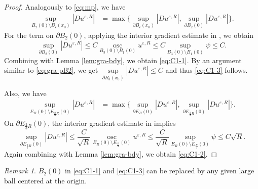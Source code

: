 \documentclass[reqno]{amsart}
\theoremstyle{remark}
\newtheorem{remark}[theorem]{Remark}
\theoremstyle{definition}
\numberwithin{equation}{section}
\begin{document}
\begin{proof}
	Analogously to \eqref{eq:mp}, we have
    \begin{equation*}
    \begin{aligned}
        \sup_{B_2(0) \setminus B_\varepsilon(x_0)} |Du^{\varepsilon,R}| 
        &= \max \Big\{ \sup_{\partial B_\varepsilon(x_0)} |Du^{\varepsilon,R}|, \sup_{\partial B_2(0)} |Du^{\varepsilon,R}| \Big\}.
    \end{aligned}
    \end{equation*}
	For the term on $\partial B_{2}(0)$, applying the interior gradient estimate in \cite{Chou-Wang}, we obtain
    \begin{equation}\label{eq:gra-pB2}
        \sup_{\partial B_2(0)} |Du^{\varepsilon,R}| \leq C\operatorname*{osc}_{B_3(0) \setminus B_1(0)} u^{\varepsilon,R} \leq C \sup_{B_3(0) \setminus B_1(0)} \psi \leq C.
    \end{equation}
    Combining with Lemma \ref{lem:gra-bdy}, we obtain \eqref{eq:C1-1}. By an argument similar to \eqref{eq:gra-pB2}, we get $\sup\limits_{\partial B_\delta(x_0)}|Du^{\varepsilon,R}|\leq C$ and thus \eqref{eq:C1-3} follows.

	Also, we have
	\begin{equation*} 
    \begin{aligned}
        \sup_{E_R(0) \setminus E_{\frac{2}{3}R}(0)} |Du^{\varepsilon,R}| 
        &= \max \Big\{ \sup_{\partial E_R(0)} |Du^{\varepsilon,R}|, \sup_{\partial E_{\frac{2}{3}R}(0)} |Du^{\varepsilon,R}| \Big\}.
    \end{aligned}
    \end{equation*}
    On $\partial E_{\frac{2}{3}R}(0)$, the interior gradient estimate in \cite{Chou-Wang} implies
    \begin{equation*}
        \sup_{\partial E_{\frac{2}{3}R}(0)} |Du^{\varepsilon,R}| \leq \frac{C}{\sqrt{R}} \operatorname*{osc}_{E_R(0) \setminus E_{\frac{R}{3}}(0)} u^{\varepsilon,R} \leq \frac{C}{\sqrt R} \sup_{E_R(0) \setminus E_{\frac{R}{3}}(0)}\psi \leq C\sqrt{R}.
    \end{equation*}
    Again combining with Lemma \ref{lem:gra-bdy}, we obtain \eqref{eq:C1-2}.
\end{proof}
\begin{remark}\label{rmk:Du-est}
	$B_2(0)$ in \eqref{eq:C1-1} and \eqref{eq:C1-3} can be replaced by any given large ball centered at the origin.
\end{remark} 
\end{document}
